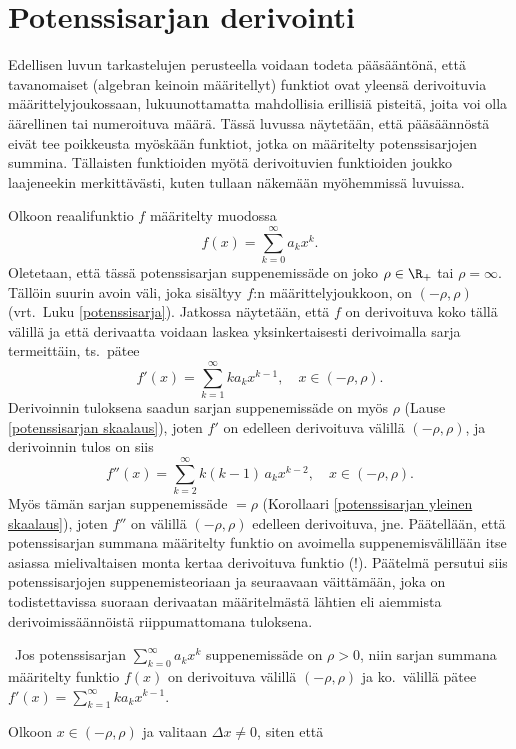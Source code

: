 \section{Potenssisarjan derivointi} \label{potsarjan derivaatta}
\alku

Edellisen luvun tarkastelujen perusteella voidaan todeta pääsääntönä, että tavanomaiset
(algebran keinoin määritellyt) funktiot ovat yleensä derivoituvia määrittelyjoukossaan,
lukuunottamatta mahdollisia erillisiä pisteitä, joita voi olla äärellinen tai numeroituva
määrä. Tässä luvussa näytetään, että pääsäännöstä eivät tee poikkeusta myöskään funktiot,
jotka on määritelty potenssisarjojen summina. Tällaisten funktioiden myötä derivoituvien
funktioiden joukko laajeneekin merkittävästi, kuten tullaan näkemään myöhemmissä luvuissa.

Olkoon reaalifunktio $f$ määritelty muodossa
\[
f(x) = \sum_{k=0}^\infty a_k x^k.
\]
Oletetaan, että tässä potenssisarjan suppenemissäde on joko $\rho\in\R_+$ tai $\rho=\infty$.
Tällöin suurin avoin väli, joka sisältyy $f$:n määrittelyjoukkoon, on $(-\rho,\rho)$
(vrt.\ Luku \ref{potenssisarja}). Jatkossa näytetään, että $f$ on derivoituva koko tällä
välillä ja että derivaatta voidaan laskea yksinkertaisesti derivoimalla sarja termeittäin,
ts.\ pätee
\[
f'(x) = \sum_{k=1}^\infty k a_k x^{k-1}, \quad x \in (-\rho,\rho).
\]
Derivoinnin tuloksena saadun sarjan suppenemissäde on myös $\rho$ (Lause
\ref{potenssisarjan skaalaus}), joten $f'$ on edelleen derivoituva välillä $(-\rho,\rho)$,
ja derivoinnin tulos on siis
\[
f''(x) = \sum_{k=2}^\infty k(k-1)\,a_k x^{k-2}, \quad x \in (-\rho,\rho).
\]
Myös tämän sarjan suppenemissäde $=\rho$ (Korollaari \ref{potenssisarjan yleinen skaalaus}),
joten $f''$ on välillä $(-\rho,\rho)$ edelleen derivoituva, jne. Päätellään, että
potenssisarjan summana määritelty funktio on avoimella suppenemisvälillään itse asiassa
mielivaltaisen monta kertaa derivoituva funktio (!). Päätelmä persutui siis potenssisarjojen
suppenemisteoriaan ja seuraavaan väittämään, joka on todistettavissa suoraan derivaatan
määritelmästä lähtien eli aiemmista derivoimissäännöistä riippumattomana tuloksena.
\begin{Lause} \label{potenssisarja on derivoituva} \, Jos 
potenssisarjan $\sum_{k=0}^\infty a_k x^k$ suppenemissäde on $\rho>0$, niin sarjan summana 
määritelty funktio $f(x)$ on derivoituva välillä $(-\rho,\rho)$ ja ko.\ välillä pätee 
$f'(x)=\sum_{k=1}^\infty k a_k x^{k-1}$. 
\end{Lause}
\tod Olkoon $x\in (-\rho,\rho)$ ja valitaan $\Delta x \neq 0$, siten että

